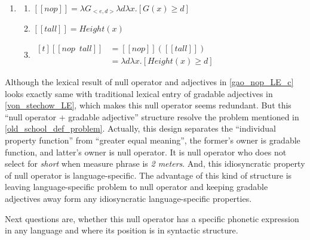 \documentclass{ctexart}
\begin{document}
\begin{enumerate}
    \item \label{gao_nop_LE}

    \begin{enumerate}
        \item \label{gao_nop_LE_a} 
        $[\![nop]\!]=\lambda G_{<e,d>}\lambda d \lambda x.[G(x) \geq d]$

        \item \label{gao_nop_LE_b} 
        $[\![tall]\!]=Height(x)$

        \item \label{gao_nop_LE_c} 
        $\begin{aligned}[t]
            [\![nop \enspace tall]\!] &= [\![nop]\!]([\![tall]\!]) \\
            &= \lambda d \lambda x.[Height(x) \geq d]
        \end{aligned}$

    \end{enumerate}
\end{enumerate}

Although the lexical result of null operator and adjectives in \ref{gao_nop_LE_c} looks exactly same with traditional lexical entry of gradable adjectives in \ref{von_stechow_LE}, which makes this null operator seems redundant. But this ``null operator + gradable adjective'' structure resolve the problem mentioned in \ref{old_school_def_problem}. Actually, this design separates the ``individual property function'' from ``greater equal meaning'', the former's owner is gradable function, and latter's owner is null operator. It is null operator who does not select for \textit{short} when measure phrase is \textit{2 meters}. And, this idiosyncratic property of null operator is language-specific. The advantage of this kind of structure is leaving language-specific problem to null operator and keeping gradable adjectives away form any idiosyncratic language-specific properties.

Next questions are, whether this null operator has a specific phonetic expression in any language and where its position is in syntactic structure. 
\end{document}
